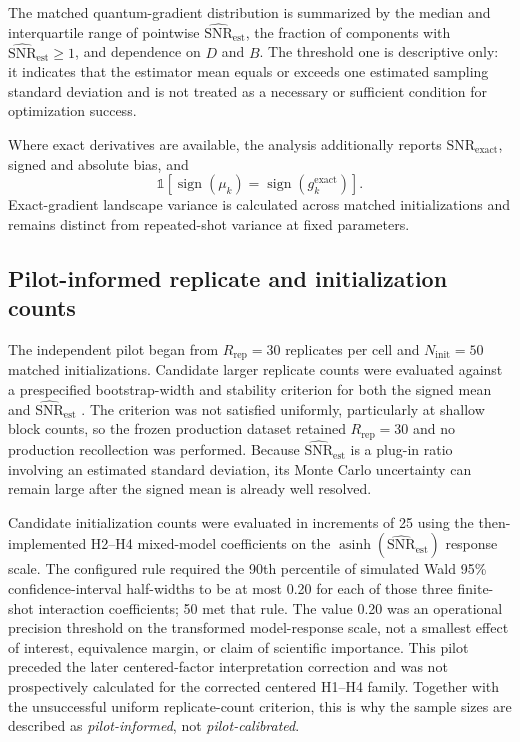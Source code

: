 \documentclass[pdflatex,sn-basic,Numbered]{sn-jnl}
\newcommand{\snrest}{\widehat{\mathrm{SNR}}_{\mathrm{est}}}
\newcommand{\snrexact}{\mathrm{SNR}_{\mathrm{exact}}}
\begin{document}
The matched quantum-gradient distribution is summarized by the median and interquartile range of pointwise $\snrest$, the fraction of components with $\snrest\ge1$, and dependence on $D$ and $B$. The threshold one is descriptive only: it indicates that the estimator mean equals or exceeds one estimated sampling standard deviation and is not treated as a necessary or sufficient condition for optimization success.

Where exact derivatives are available, the analysis additionally reports $\snrexact$, signed and absolute bias, and
\[
\mathbb{1}\!\left[
\operatorname{sign}(\mu_k)
=\operatorname{sign}(g_k^{\mathrm{exact}})
\right].
\]
Exact-gradient landscape variance is calculated across matched initializations and remains distinct from repeated-shot variance at fixed parameters.

\subsection{Pilot-informed replicate and initialization counts}
\label{sec:calibration}

The independent pilot began from $R_{\mathrm{rep}}=30$ replicates per cell and $N_{\mathrm{init}}=50$ matched initializations. Candidate larger replicate counts were evaluated against a prespecified bootstrap-width and stability criterion for both the signed mean and $\snrest$ \cite{davison1997bootstrap,tamiya2022stochastic}. The criterion was not satisfied uniformly, particularly at shallow block counts, so the frozen production dataset retained $R_{\mathrm{rep}}=30$ and no production recollection was performed. Because $\snrest$ is a plug-in ratio involving an estimated standard deviation, its Monte Carlo uncertainty can remain large after the signed mean is already well resolved.

Candidate initialization counts were evaluated in increments of 25 using the then-implemented H2--H4 mixed-model coefficients on the $\operatorname{asinh}(\snrest)$ response scale. The configured rule required the 90th percentile of simulated Wald 95\% confidence-interval half-widths to be at most 0.20 for each of those three finite-shot interaction coefficients; 50 met that rule. The value 0.20 was an operational precision threshold on the transformed model-response scale, not a smallest effect of interest, equivalence margin, or claim of scientific importance. This pilot preceded the later centered-factor interpretation correction and was not prospectively calculated for the corrected centered H1--H4 family. Together with the unsuccessful uniform replicate-count criterion, this is why the sample sizes are described as \emph{pilot-informed}, not \emph{pilot-calibrated}.
\end{document}
